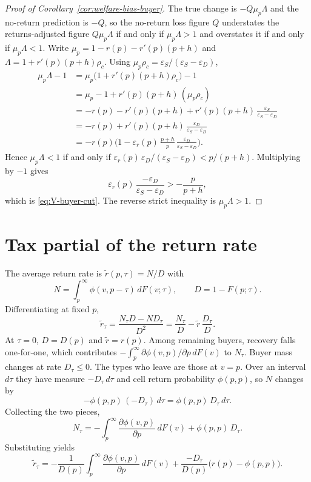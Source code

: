 \begin{proof}[Proof of Corollary~\ref{cor:welfare-bias-buyer}]
The true change is $-Q\mu_p\Lambda$ and the no-return prediction is $-Q$, so
the no-return loss figure $Q$ understates the returns-adjusted figure
$Q\mu_p\Lambda$ if and only if $\mu_p\Lambda>1$ and overstates it if and only
if $\mu_p\Lambda<1$.  Write
$\mu_p=1-r(p)-r'(p)(p+h)$ and $\Lambda=1+r'(p)(p+h)\rho_c$.  Using
$\mu_p\rho_c=\varepsilon_S/(\varepsilon_S-\varepsilon_D)$,
\begin{align*}
  \mu_p\Lambda-1
  &=\mu_p\bigl(1+r'(p)(p+h)\rho_c\bigr)-1
  \\
  &=\mu_p-1+r'(p)(p+h)\,(\mu_p\rho_c)
  \\
  &=-r(p)-r'(p)(p+h)
    +r'(p)(p+h)\,\frac{\varepsilon_S}{\varepsilon_S-\varepsilon_D}
  \\
  &=-r(p)+r'(p)(p+h)\,\frac{\varepsilon_D}{\varepsilon_S-\varepsilon_D}
  \\
  &=-r(p)\Biggl(1-\varepsilon_r(p)\,\frac{p+h}{p}\,
       \frac{\varepsilon_D}{\varepsilon_S-\varepsilon_D}\Biggr).
\end{align*}
Hence $\mu_p\Lambda<1$ if and only if
$\varepsilon_r(p)\,\varepsilon_D/(\varepsilon_S-\varepsilon_D)<p/(p+h)$.
Multiplying by $-1$ gives
\[
  \varepsilon_r(p)\,
  \frac{-\varepsilon_D}{\varepsilon_S-\varepsilon_D}
  >
  -\frac{p}{p+h},
\]
which is \eqref{eq:V-buyer-cut}.  The reverse strict inequality is
$\mu_p\Lambda>1$.
\end{proof}

\section{Tax partial of the return rate}
\label{app:rtau}

The average return rate is $\tilde{r}(p,\tau)=N/D$ with
\[
  N=\int_p^\infty \phi(v,p-\tau)\,dF(v;\tau),
  \qquad
  D=1-F(p;\tau).
\]
Differentiating at fixed $p$,
\[
  \tilde{r}_{\tau}
  =\frac{N_{\tau}D-ND_{\tau}}{D^{2}}
  =\frac{N_{\tau}}{D}-\tilde{r}\,\frac{D_{\tau}}{D}.
\]
At $\tau=0$, $D=D(p)$ and $\tilde{r}=r(p)$.  Among remaining buyers, recovery
falls one-for-one, which contributes
$-\int_p^\infty \partial\phi(v,p)/\partial p\,dF(v)$ to $N_{\tau}$.  Buyer mass
changes at rate $D_{\tau}\le 0$.  The types who leave are those at $v=p$.  Over
an interval $d\tau$ they have measure $-D_{\tau}\,d\tau$ and cell return
probability $\phi(p,p)$, so $N$ changes by
\[
  -\phi(p,p)\,(-D_{\tau})\,d\tau
  =\phi(p,p)\,D_{\tau}\,d\tau.
\]
Collecting the two pieces,
\[
  N_{\tau}
  =-\int_p^\infty \frac{\partial\phi(v,p)}{\partial p}\,dF(v)
  +\phi(p,p)\,D_{\tau}.
\]
Substituting yields
\begin{equation}
  \tilde{r}_{\tau}
  =-\frac{1}{D(p)}\int_p^\infty \frac{\partial\phi(v,p)}{\partial p}\,dF(v)
  +\frac{-D_{\tau}}{D(p)}\bigl(r(p)-\phi(p,p)\bigr).
  \label{eq:rtau-split}
\end{equation}
